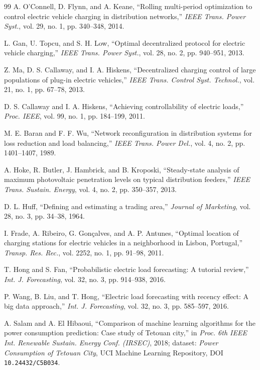 \documentclass[10pt,journal]{IEEEtran}
\begin{document}
\begin{thebibliography}{99}
A. O'Connell, D. Flynn, and A. Keane,
``Rolling multi-period optimization to control electric vehicle charging in
distribution networks,''
\emph{IEEE Trans. Power Syst.}, vol. 29, no. 1, pp. 340--348, 2014.

L. Gan, U. Topcu, and S. H. Low,
``Optimal decentralized protocol for electric vehicle charging,''
\emph{IEEE Trans. Power Syst.}, vol. 28, no. 2, pp. 940--951, 2013.

Z. Ma, D. S. Callaway, and I. A. Hiskens,
``Decentralized charging control of large populations of plug-in electric
vehicles,''
\emph{IEEE Trans. Control Syst. Technol.}, vol. 21, no. 1, pp. 67--78, 2013.

D. S. Callaway and I. A. Hiskens,
``Achieving controllability of electric loads,''
\emph{Proc. IEEE}, vol. 99, no. 1, pp. 184--199, 2011.

M. E. Baran and F. F. Wu,
``Network reconfiguration in distribution systems for loss reduction and
load balancing,''
\emph{IEEE Trans. Power Del.}, vol. 4, no. 2, pp. 1401--1407, 1989.

A. Hoke, R. Butler, J. Hambrick, and B. Kroposki,
``Steady-state analysis of maximum photovoltaic penetration levels on
typical distribution feeders,''
\emph{IEEE Trans. Sustain. Energy}, vol. 4, no. 2, pp. 350--357, 2013.

D. L. Huff,
``Defining and estimating a trading area,''
\emph{Journal of Marketing}, vol. 28, no. 3, pp. 34--38, 1964.

I. Frade, A. Ribeiro, G. Gon\c{c}alves, and A. P. Antunes,
``Optimal location of charging stations for electric vehicles in a
neighborhood in Lisbon, Portugal,''
\emph{Transp. Res. Rec.}, vol. 2252, no. 1, pp. 91--98, 2011.

T. Hong and S. Fan,
``Probabilistic electric load forecasting: A tutorial review,''
\emph{Int. J. Forecasting}, vol. 32, no. 3, pp. 914--938, 2016.

P. Wang, B. Liu, and T. Hong,
``Electric load forecasting with recency effect: A big data approach,''
\emph{Int. J. Forecasting}, vol. 32, no. 3, pp. 585--597, 2016.

A. Salam and A. El Hibaoui,
``Comparison of machine learning algorithms for the power consumption
prediction: Case study of Tetouan city,''
in \emph{Proc. 6th IEEE Int. Renewable Sustain. Energy Conf. (IRSEC)}, 2018;
dataset: \emph{Power Consumption of Tetouan City}, UCI Machine Learning
Repository, DOI \texttt{10.24432/C5B034}.


\end{thebibliography}
\end{document}
